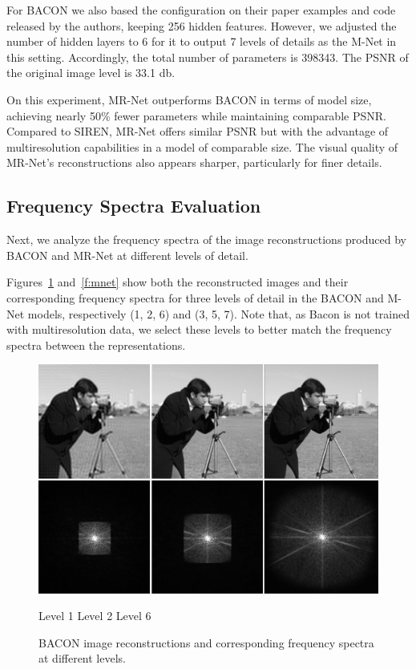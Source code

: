 For BACON we also based the configuration on their paper examples and code released by the authors, keeping 256 hidden features. However, we adjusted the number of hidden layers to 6 for it to output 7 levels of details as the M-Net in this setting. Accordingly, the total number of parameters is 398343. The PSNR of the original image level is 33.1 db.

On this experiment, MR-Net outperforms BACON in terms of model size, achieving nearly 50\% fewer parameters while maintaining comparable PSNR. Compared to SIREN, MR-Net offers similar PSNR but with the advantage of multiresolution capabilities in a model of comparable size. The visual quality of MR-Net's reconstructions also appears sharper, particularly for finer details.

\subsection{Frequency Spectra Evaluation}
\label{sub:spectra-eval}

Next, we analyze the frequency spectra of the image reconstructions produced by BACON and MR-Net at different levels of detail.

Figures~\ref{f:bacon} and~\ref{f:mnet} show both the reconstructed images and their corresponding frequency spectra for three levels of detail in the BACON and M-Net models, respectively (1, 2, 6) and (3, 5, 7). Note that, as Bacon is not trained with multiresolution data, we select these levels to better match the frequency spectra between the representations.

\begin{figure}[!h]
\centering
\includegraphics[width=0.85\linewidth]{img/ch5/bacon-3.png}
\centerline{\small Level 1 \hfil Level 2 \hfil Level 6}
\caption{BACON image reconstructions and corresponding frequency spectra at different levels.}
\label{f:bacon}
\end{figure}

